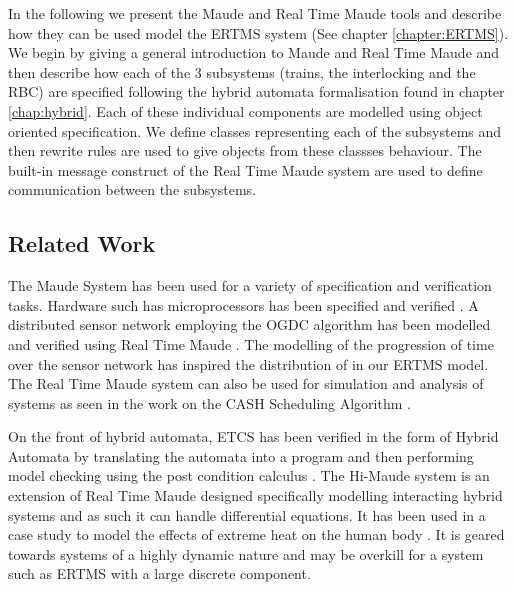 \newcommand{\rtmaude}{Real Time Maude}


In the following we present the Maude \cite{MC03,Maude} and Real Time Maude \cite{PO02,PO04,RTMaude} tools and describe how they can be used model the ERTMS system (See chapter \ref{chapter:ERTMS}).   We begin by giving a general introduction to Maude and Real Time Maude and then describe how each of the 3 subsystems (trains, the interlocking and the RBC) are specified following the hybrid automata formalisation found in chapter \ref{chap:hybrid}. Each of these individual components are modelled using object oriented specification. We define classes representing each of the subsystems and then rewrite rules are used to give objects from these classses behaviour. The  built-in message construct of the Real Time Maude system are used to define communication between the subsystems.

\subsection*{Related Work}
The Maude System has been used for a variety of specification and verification tasks. Hardware such has microprocessors has been specified and verified \cite{NH00}. A distributed sensor network employing the OGDC algorithm has been modelled and verified using Real Time Maude \cite{PO07}. The modelling of the progression of time over the sensor network has inspired the distribution of in our ERTMS model. The Real Time Maude system can also be used for simulation and analysis of systems as seen in the work on the CASH Scheduling Algorithm \cite{PO06}. 

On the front of hybrid automata, ETCS has been verified in the form of Hybrid Automata by translating the automata into a program and then performing model checking using the post condition calculus \cite{DI13}. The Hi-Maude system \cite{MF11} is an extension of Real Time Maude designed specifically modelling interacting hybrid systems and as such it can handle differential equations. It has been used in a case study to model the effects of extreme heat on the human body \cite{MF12}. It is geared towards systems of a highly dynamic nature and may be overkill for a system such as ERTMS with a large discrete component.


